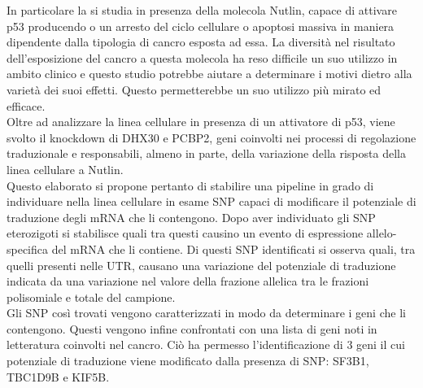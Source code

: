 In particolare la si studia in presenza della molecola Nutlin, capace di attivare p53 producendo o un arresto del ciclo cellulare o apoptosi massiva in maniera dipendente dalla tipologia di cancro esposta ad essa.
La diversit\`a nel risultato dell'esposizione del cancro a questa molecola ha reso difficile un suo utilizzo in ambito clinico e questo studio potrebbe aiutare a determinare i motivi dietro alla variet\`a dei suoi effetti.
Questo permetterebbe un suo utilizzo pi\`u mirato ed efficace.\\
Oltre ad analizzare la linea cellulare in presenza di un attivatore di p53, viene svolto il knockdown di DHX30 e PCBP2, geni coinvolti nei processi di regolazione traduzionale e responsabili, almeno in parte, della variazione della risposta della linea cellulare a Nutlin.\\[12pt]
Questo elaborato si propone pertanto di stabilire una pipeline in grado di individuare nella linea cellulare in esame SNP capaci di modificare il potenziale di traduzione degli mRNA che li contengono.
Dopo aver individuato gli SNP eterozigoti si stabilisce quali tra questi causino un evento di espressione allelo-specifica del mRNA che li contiene.
Di questi SNP identificati si osserva quali, tra quelli presenti nelle UTR, causano una variazione del potenziale di traduzione indicata da una variazione nel valore della frazione allelica tra le frazioni polisomiale e totale del campione.\\
Gli SNP cos\`i trovati vengono caratterizzati in modo da determinare i geni che li contengono.
Questi vengono infine confrontati con una lista di geni noti in letteratura coinvolti nel cancro.
Ci\`o ha permesso l'identificazione di $3$ geni il cui potenziale di traduzione viene modificato dalla presenza di SNP: SF3B1, TBC1D9B e KIF5B.
